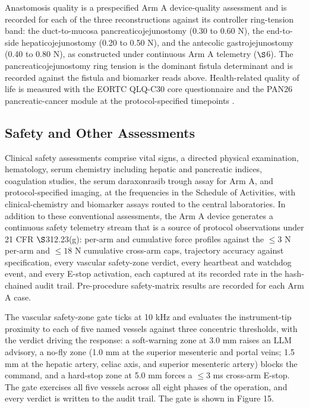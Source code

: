 Anastomosis quality is a prespecified Arm A device-quality assessment and is recorded
for each of the three reconstructions against its controller ring-tension band: the
duct-to-mucosa pancreaticojejunostomy (0.30 to 0.60 N), the end-to-side
hepaticojejunostomy (0.20 to 0.50 N), and the antecolic gastrojejunostomy (0.40 to
0.80 N), as constructed under continuous Arm A telemetry ($\S$6). The
pancreaticojejunostomy ring tension is the dominant fistula determinant and is
recorded against the fistula and biomarker reads above. Health-related quality of
life is measured with the EORTC QLQ-C30 core questionnaire and the PAN26
pancreatic-cancer module at the protocol-specified timepoints \cite{EORTCqlqc30}.

\subsection{Safety and Other Assessments}

Clinical safety assessments comprise vital signs, a directed physical examination,
hematology, serum chemistry including hepatic and pancreatic indices, coagulation
studies, the serum daraxonrasib trough assay for Arm A, and protocol-specified
imaging, at the frequencies in the Schedule of Activities, with clinical-chemistry
and biomarker assays routed to the central laboratories. In addition to these
conventional assessments, the Arm A device generates a continuous safety telemetry
stream that is a source of protocol observations under 21 CFR $\S$312.23(g): per-arm
and cumulative force profiles against the $\leq 3$ N per-arm and $\leq 18$ N
cumulative cross-arm caps, trajectory accuracy against specification, every vascular
safety-zone verdict, every heartbeat and watchdog event, and every E-stop
activation, each captured at its recorded rate in the hash-chained audit trail.
Pre-procedure safety-matrix results are recorded for each Arm A case.

The vascular safety-zone gate ticks at 10 kHz and evaluates the instrument-tip
proximity to each of five named vessels against three concentric thresholds, with
the verdict driving the response: a soft-warning zone at 3.0 mm raises an LLM
advisory, a no-fly zone (1.0 mm at the superior mesenteric and portal veins; 1.5 mm
at the hepatic artery, celiac axis, and superior mesenteric artery) blocks the
command, and a hard-stop zone at 5.0 mm forces a $\leq 3$ ms cross-arm E-stop. The
gate exercises all five vessels across all eight phases of the operation, and every
verdict is written to the audit trail. The gate is shown in Figure 15.

